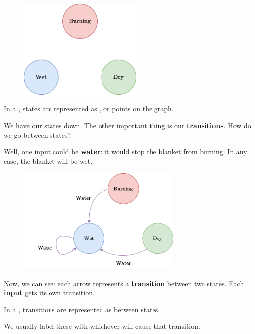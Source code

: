         \begin{figure}[H]
            \centering
            \includegraphics[width=60mm,scale=0.4]{images/rnn_images/std_states.png}
        \end{figure}
        
        \begin{concept}
            In a , states are represented as , or points on the graph.
        \end{concept}
        
        We have our states down. The other important thing is our \textbf{transitions}. How do we go between states?
        
        Well, one input could be \textbf{water}: it would stop the blanket from burning. In any case, the blanket will be wet.
        
        \begin{figure}[H]
            \centering
            \includegraphics[width=80mm,scale=0.4]{images/rnn_images/std_water.png}
        \end{figure}
        
        Now, we can see: each arrow represents a \textbf{transition} between two states. Each \textbf{input} gets its own transition.\\
        
        \begin{concept}
            In a , transitions are represented as  between states.
            
            We usually label these with whichever  will cause that transition.
        \end{concept}
        
